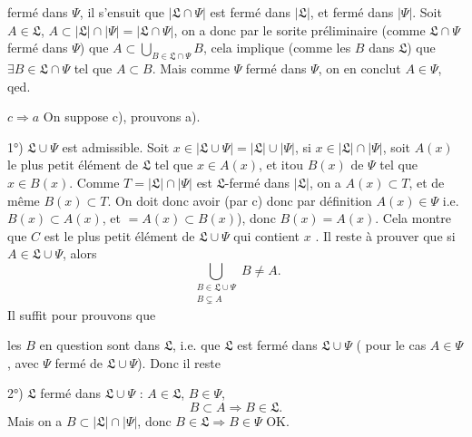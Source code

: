 \documentclass[11pt,a4paper]{article}
\begin{document}
fermé dans $\Psi$, il s'ensuit que $|\mathfrak{L} \cap \Psi|$ est fermé dans $|\mathfrak{L}|$, et fermé dans $|\Psi|$. Soit $A \in \mathfrak{L}$, $A \subset |\mathfrak{L}| \cap |\Psi| = |\mathfrak{L} \cap \Psi|$, on a donc par le sorite préliminaire (comme $\mathfrak{L} \cap \Psi$ fermé dans $\Psi$) que $A \subset \bigcup_{B \in \mathfrak{L} \cap \Psi} B$, cela implique (comme les $B$ dans $\mathfrak{L}$) que  $\exists B \in \mathfrak{L} \cap \Psi$ tel que $A \subset B$.  Mais comme \ill{} $\Psi$ fermé dans $\Psi$, on en conclut $A \in \Psi$, qed.

$c \Rightarrow a$ On suppose c), prouvons a).

1°) $\mathfrak{L} \cup \Psi$ est admissible. Soit $x \in |\mathfrak{L} \cup \Psi| = |\mathfrak{L}| \cup |\Psi|$,  si $x \in |\mathfrak{L}| \cap |\Psi|$, soit $A(x)$ le plus petit élément de $\mathfrak{L}$ tel que $x \in A(x)$, et itou $B(x)$ de $\Psi$ tel que $x \in B(x)$. Comme $T = |\mathfrak{L}| \cap |\Psi|$ est $\mathfrak{L}$-fermé dans $|\mathfrak{L}|$, on a $A(x) \subset T$, et de même $B(x) \subset T$. On doit donc avoir (par c)  donc par définition  $A(x) \in \Psi$ i.e. $B(x) \subset A(x)$, et $= A(x) \subset B(x)$), donc $B(x) = A(x)$.  Cela montre que $C$ est le plus petit élément de $\mathfrak{L} \cup \Psi$ qui contient $x$ . Il reste à prouver que si $A \in \mathfrak{L} \cup \Psi$, alors
\[
  \bigcup_{\substack{B \in \mathfrak{L} \cup \Psi \\ B \subsetneq A}} B \neq A .
\]
  Il suffit pour \ill{}   prouvons que

les $B$ en question sont dans $\mathfrak{L}$, i.e. que $\mathfrak{L}$ est fermé dans $\mathfrak{L} \cup \Psi$ ( pour le cas $A \in \Psi$, avec $\Psi$ fermé de $\mathfrak{L} \cup \Psi$). Donc il reste

2°) $\mathfrak{L}$ fermé dans $\mathfrak{L} \cup \Psi$ : $A \in \mathfrak{L}$, $B \in \Psi$,
\[
  B \subset A \Longrightarrow B \in \mathfrak{L} .
\]
Mais on a \struck{\ill{}} $B \subset |\mathfrak{L}| \cap |\Psi|$, donc $B \in \mathfrak{L} \Rightarrow B \in \Psi$ OK.
\end{document}
